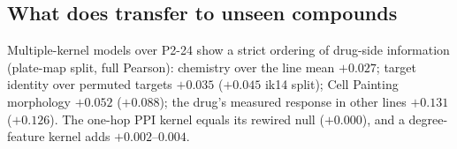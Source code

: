 \subsection{What does transfer to unseen compounds}
\label{sec:tiers}
Multiple-kernel models over P2-24 show a strict ordering of drug-side information
(plate-map split, full Pearson): chemistry over the line mean $+0.027$; target identity over permuted
targets $+0.035$ ($+0.045$ ik14 split); Cell Painting morphology $+0.052$ ($+0.088$); the drug's
measured response in other lines $+0.131$ ($+0.126$). The one-hop PPI kernel equals its rewired null
($+0.000$), and a degree-feature kernel adds $+0.002$--$0.004$.
